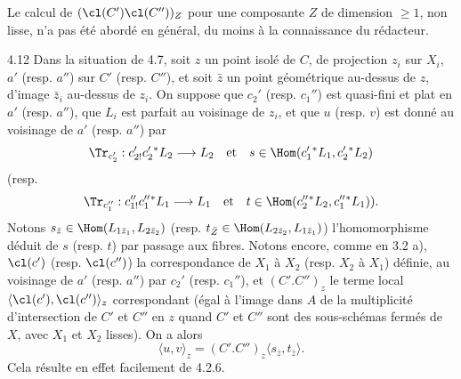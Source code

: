 Le calcul de $(\cl(C')\cl(C''))_Z$ pour une composante $Z$ de dimension $\geq 1$, non lisse, n'a pas été abordé en général, du moins à la connaissance du rédacteur.

\begin{statement}{4.12}
Dans la situation de 4.7, soit $z$ un point isolé de $C$, de projection $z_i$ sur $X_i$, $a'$ (resp. $a''$) sur $C'$ (resp. $C''$), et soit $\bar z$ un point géométrique au-dessus de $z$, d'image $\bar z_i$ au-dessus de $z_i$. On suppose que $c_2'$ (resp. $c_1''$) est quasi-fini et plat en $a'$ (resp. $a''$), que $L_i$ est parfait au voisinage de $z_i$, et que $u$ (resp. $v$) est donné au voisinage de $a'$ (resp. $a''$) par
\[
\Tr_{c_2'}:c_{2!}'c_2'{}^*L_2\longrightarrow L_2
\quad\text{et}\quad
s\in\Hom(c_1'{}^*L_1,c_2'{}^*L_2)
\]
(resp.
\[
\Tr_{c_1''}:c_{1!}''c_1''{}^*L_1\longrightarrow L_1
\quad\text{et}\quad
t\in\Hom(c_2''{}^*L_2,c_1''{}^*L_1)).
\]
Notons $s_{\bar z}\in\Hom(L_{1\bar z_1},L_{2\bar z_2})$ (resp. $t_{\bar Z}\in\Hom(L_{2\bar z_2},L_{1\bar z_1})$) l'homomorphisme déduit de $s$ (resp. $t$) par passage aux fibres. Notons encore, comme en 3.2 a), $\cl(c')$ (resp. $\cl(c'')$) la correspondance de $X_1$ à $X_2$ (resp. $X_2$ à $X_1$) définie, au voisinage de $a'$ (resp. $a''$) par $c_2'$ (resp. $c_1''$), et $(C'.C'')_z$ le terme local $\langle\cl(c'),\cl(c'')\rangle_z$ correspondant (égal à l'image dans $A$ de la
multiplicité d'intersection de $C'$ et $C''$ en $z$ quand $C'$ et $C''$ sont des sous-schémas fermés de $X$, avec $X_1$ et $X_2$ lisses). On a alors
\begin{equation}
\tag{4.12.1}
\langle u,v\rangle_z=(C'.C'')_z\langle s_{\bar z},t_{\bar z}\rangle.
\end{equation}
Cela résulte en effet facilement de 4.2.6.
\end{statement}


